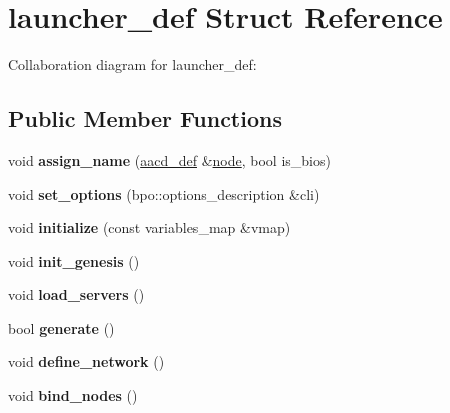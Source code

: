 \hypertarget{structlauncher__def}{}\section{launcher\+\_\+def Struct Reference}
\label{structlauncher__def}


Collaboration diagram for launcher\+\_\+def\+:
\subsection*{Public Member Functions}
\begin{DoxyCompactItemize}
\item 
\mbox{\label{structlauncher__def_ae97fc8e7f54a424296a3e6a006f14618}} 
void {\bfseries assign\+\_\+name} (\mbox{\hyperlink{classaacd__def}{aacd\+\_\+def}} \&\mbox{\hyperlink{structnode}{node}}, bool is\+\_\+bios)
\item 
\mbox{\label{structlauncher__def_a1cb1885545cb81aad9c087f135bf8b66}} 
void {\bfseries set\+\_\+options} (bpo\+::options\+\_\+description \&cli)
\item 
\mbox{\label{structlauncher__def_af3c15f068ff5a367e343aa83be62c3a3}} 
void {\bfseries initialize} (const variables\+\_\+map \&vmap)
\item 
\mbox{\label{structlauncher__def_abb9e5492e4e034ffcc42a74d893b0f71}} 
void {\bfseries init\+\_\+genesis} ()
\item 
\mbox{\label{structlauncher__def_a7a92f6e8142ed7cbc9f4448e8c673740}} 
void {\bfseries load\+\_\+servers} ()
\item 
\mbox{\label{structlauncher__def_aba7038ee47ccc688104d0d527fa99843}} 
bool {\bfseries generate} ()
\item 
\mbox{\label{structlauncher__def_a8f050260f20b2369158e085e412bc838}} 
void {\bfseries define\+\_\+network} ()
\item 
\mbox{\label{structlauncher__def_aa2490bf4908ce8f8ee2faaacd2372f2c}} 
void {\bfseries bind\+\_\+nodes} ()

\end{DoxyCompactItemize}
